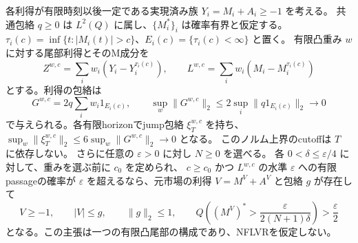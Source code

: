 \begin{lemma}[凸尾部の許容性と具体的な包絡]\label{lem:quantitative-tails}
各利得が有限時刻以後一定である実現済み族 $Y_i=M_i+A_i\geq-1$ を考える。
共通包絡 $q\geq0$ は $L^2(Q)$ に属し、$\{M_i^*\}_i$ は確率有界と仮定する。
$\tau_i(c)=\inf\{t:|M_i(t)|>c\}$、$E_i(c)=\{\tau_i(c)<\infty\}$ と置く。
有限凸重み $w$ に対する尾部利得とそのM成分を
\[
 Z^{w,c}=\sum_iw_i(Y_i-Y_i^{\tau_i(c)}),\qquad
 L^{w,c}=\sum_iw_i(M_i-M_i^{\tau_i(c)})
\]
とする。利得の包絡は
\[
 G^{w,c}=2q\sum_iw_i1_{E_i(c)},\qquad
 \sup_w\|G^{w,c}\|_2\leq2\sup_i\|q1_{E_i(c)}\|_2\longrightarrow0
\]
で与えられる。各有限horizonでjump包絡 $\xi_T^{w,c}$ を持ち、
$\sup_w\|\xi_T^{w,c}\|_2\leq6\sup_w\|G^{w,c}\|_2\to0$ となる。
このノルム上界のcutoffは $T$ に依存しない。
さらに任意の $\varepsilon>0$ に対し $N\geq0$ を選べる。
各 $0<\delta\leq\varepsilon/4$ に対して、重みを選ぶ前に $c_0$ を定められ、
$c\geq c_0$ かつ $L^{w,c}$ の水準 $\varepsilon$ への有限passageの確率が
$\varepsilon$ を超えるなら、元市場の利得 $V=M^V+A^V$ と包絡 $g$ が存在して
\[
 V\geq-1,\qquad |V|\leq g,\qquad \|g\|_2\leq1,\qquad
 Q\!\left((M^V)^*>\frac{\varepsilon}{2(N+1)\delta}\right)>\frac\varepsilon2
\]
となる。この主張は一つの有限凸尾部の構成であり、NFLVRを仮定しない。

\end{lemma}
